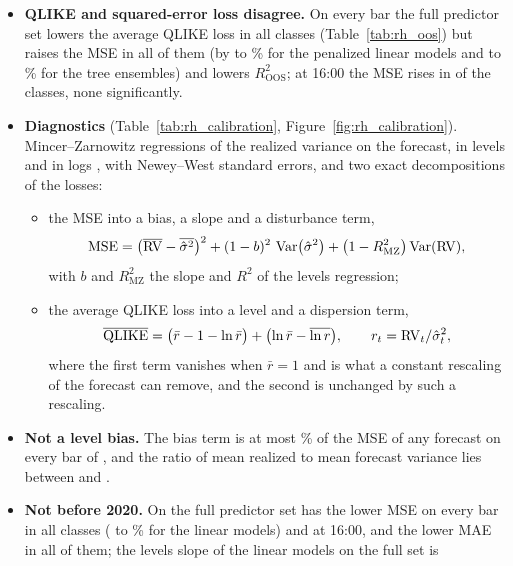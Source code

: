 \begin{itemize}
\item \textbf{QLIKE and squared-error loss disagree.} On every bar the full predictor set lowers the average QLIKE
  loss in all \rhorAfPairs{} classes (Table~\ref{tab:rh_oos}) but raises the MSE in all of them (by
  \rhcaLinMsePctBarSpanMin{} to \rhcaLinMsePctBarSpanMax\% for the penalized linear models and
  \rhcaTreeMsePctBarSpanMin{} to \rhcaTreeMsePctBarSpanMax\% for the tree ensembles) and lowers $R^2_{\mathrm{OOS}}$;
  at 16:00 the MSE rises in \rhcaNMseHigherCloseSpan{} of the classes, none significantly.
\item \textbf{Diagnostics} (Table~\ref{tab:rh_calibration}, Figure~\ref{fig:rh_calibration}). Mincer--Zarnowitz
  regressions of the realized variance on the forecast, in levels and in logs \citep{MincerZarnowitz1969}, with
  Newey--West standard errors, and two exact decompositions of the losses:
  \begin{itemize}
  \item the MSE into a bias, a slope and a disturbance term,
    \[
      \mathrm{MSE} = \bigl(\overline{\mathrm{RV}} - \overline{\hat\sigma^2}\bigr)^2 + (1 - b)^2\,\operatorname{Var}\bigl(\hat\sigma^2\bigr)
        + \bigl(1 - R^2_{\mathrm{MZ}}\bigr)\operatorname{Var}(\mathrm{RV}),
    \]
    with $b$ and $R^2_{\mathrm{MZ}}$ the slope and $R^2$ of the levels regression;
  \item the average QLIKE loss into a level and a dispersion term,
    \[
      \overline{\operatorname{QLIKE}} = \bigl(\bar r - 1 - \ln\bar r\bigr) + \bigl(\ln\bar r - \overline{\ln r}\bigr),
      \qquad r_t = \mathrm{RV}_t/\hat\sigma^2_t ,
    \]
    where the first term vanishes when $\bar r = 1$ and is what a constant rescaling of the forecast can remove, and
    the second is unchanged by such a rescaling.
  \end{itemize}
\item \textbf{Not a level bias.} The bias term is at most \rhcaAllShBiasBarOosMax\% of the MSE of any forecast
  on every bar of \rhcaYearsOos, and the ratio of mean realized to mean forecast variance lies between
  \rhcaAllRmBarOosMin{} and \rhcaAllRmBarOosMax.
\item \textbf{Not before 2020.} On \rhcaYearsPre{} the full predictor set has the lower MSE on every bar in all
  \rhorAfPairs{} classes (\rhcaLinMsePctBarPreMin{} to \rhcaLinMsePctBarPreMax\% for the linear models) and at 16:00,
  and the lower MAE in all of them; the levels slope of the linear models on the full set is

\end{itemize}

